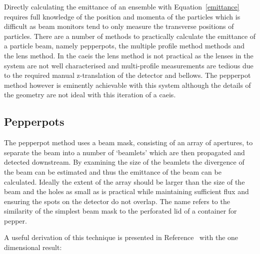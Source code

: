 Directly calculating the emittance of an ensemble with Equation~\ref{emittance} requires full knowledge of the position and momenta of the particles which is difficult as beam monitors tend to only measure the transverse positions of particles.
There are a number of methods to practically calculate the emittance of a particle beam, namely pepperpots, the multiple profile method methods and the lens method.
In the \gls{caeis} the lens method is not practical as the lenses in the system are not well characterised and multi-profile measurements are tedious due to the required manual z-translation of the detector and bellows.
The pepperpot method however is eminently achievable with this system although the details of the geometry are not ideal with this iteration of a \gls{caeis}.

\subsection{Pepperpots}

The pepperpot method uses a beam mask, consisting of an array of apertures, to separate the beam into a number of `beamlets' which are then propagated and detected downstream.
By examining the size of the beamlets the divergence of the beam can be estimated and thus the emittance of the beam can be calculated.
Ideally the extent of the array should be larger than the size of the beam and the holes as small as is practical while maintaining sufficient flux and ensuring the spots on the detector do not overlap.
The name refers to the similarity of the simplest beam mask to the perforated lid of a container for pepper.

A useful derivation of this technique is presented in Reference~\cite{zhang_emittance_1996} with the one dimensional result:

